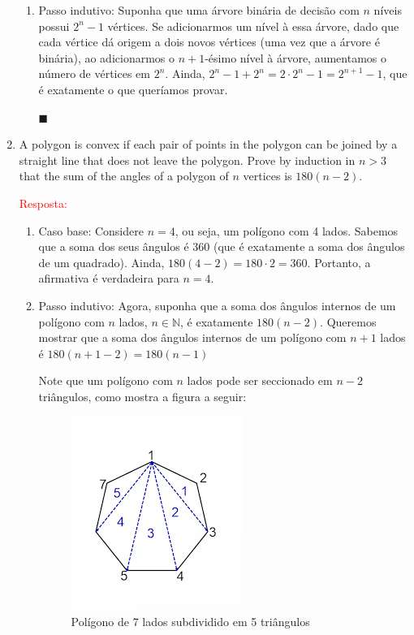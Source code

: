 \documentclass{article}
\newcommand*{\QEDA}{\hfill\ensuremath{\blacksquare}}%
\begin{document}
\begin{enumerate}
\begin{enumerate}[itemsep=0pt, label=(\roman*)]
    \item Passo indutivo: Suponha que uma árvore binária de decisão com $n$ níveis possui $2^n-1$ vértices. Se adicionarmos um nível à essa árvore, dado que cada vértice dá origem a dois novos vértices (uma vez que a árvore é binária), ao adicionarmos o $n+1$-ésimo nível à árvore, aumentamos o número de vértices em $2^n$. Ainda, $2^n-1+2^n=2\cdot 2^n-1 = 2^{n+1}-1$, que é exatamente o que queríamos provar. 
    
    \QEDA
    
    \end{enumerate}
  
  
  \item A polygon is convex if each pair of points in the polygon can be joined by a straight line that does not leave the polygon. Prove by induction in $n>3$ that the sum of the angles of a polygon of $n$ vertices is $180(n-2)$.
  
  
    \textcolor{red}{Resposta: }
    \begin{enumerate}[itemsep=0pt, label=(\roman*)]
    
    \item Caso base: Considere $n=4$, ou seja, um polígono com 4 lados. Sabemos que a soma dos seus ângulos é 360 (que é exatamente a soma dos ângulos de um quadrado). Ainda, $180(4-2) = 180 \cdot 2 = 360$. Portanto, a afirmativa é verdadeira para $n=4$. 
    
    \item Passo indutivo: Agora, suponha que a soma dos ângulos internos de um polígono com $n$ lados, $n \in \mathbb{N}$, é exatamente $180(n-2)$. Queremos mostrar que a soma dos ângulos internos de um polígono com $n+1$ lados é $180(n+1-2) = 180(n-1)$
    
    Note que um polígono com $n$ lados pode ser seccionado em $n-2$ triângulos, como mostra a figura a seguir:
    
    \begin{figure}[!h]
        \centering
            \includegraphics[scale=0.6]{Figures/hw1-img.png}
            \caption{Polígono de 7 lados subdividido em 5 triângulos}
        \label{fig:my_label}
    \end{figure}
    

\end{enumerate}
\end{enumerate}
\end{document}
